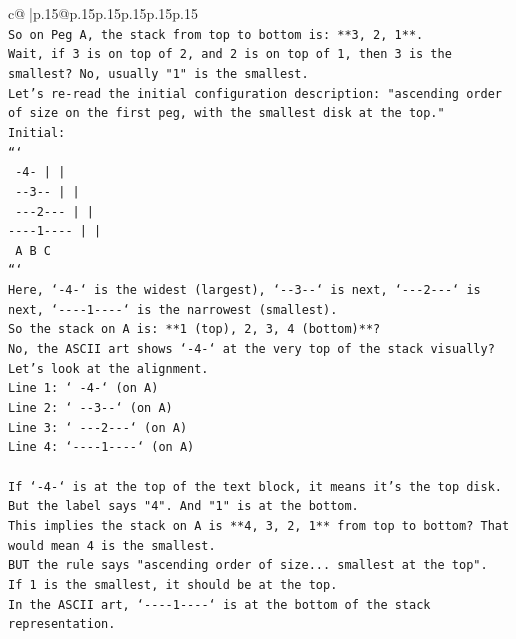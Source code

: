 \documentclass{article}
\begin{document}
{\begin{supertabular}{c@{$\;$}|p{.15\linewidth}@{}p{.15\linewidth}p{.15\linewidth}p{.15\linewidth}p{.15\linewidth}p{.15\linewidth}}
{{{\\ 
\texttt{So on Peg A, the stack from top to bottom is: **3, 2, 1**.} \\
\texttt{Wait, if 3 is on top of 2, and 2 is on top of 1, then 3 is the smallest? No, usually "1" is the smallest.} \\
\texttt{Let's re{-}read the initial configuration description: "ascending order of size on the first peg, with the smallest disk at the top."} \\
\texttt{Initial:} \\
\texttt{```} \\
\texttt{   {-}4{-}        |         |    } \\
\texttt{  {-}{-}3{-}{-}       |         |    } \\
\texttt{ {-}{-}{-}2{-}{-}{-}      |         |    } \\
\texttt{{-}{-}{-}{-}1{-}{-}{-}{-}     |         |    } \\
\texttt{    A         B         C    } \\
\texttt{```} \\
\texttt{Here, `{-}4{-}` is the widest (largest), `{-}{-}3{-}{-}` is next, `{-}{-}{-}2{-}{-}{-}` is next, `{-}{-}{-}{-}1{-}{-}{-}{-}` is the narrowest (smallest).} \\
\texttt{So the stack on A is: **1 (top), 2, 3, 4 (bottom)**?} \\
\texttt{No, the ASCII art shows `{-}4{-}` at the very top of the stack visually?} \\
\texttt{Let's look at the alignment.} \\
\texttt{Line 1: `   {-}4{-}` (on A)} \\
\texttt{Line 2: `  {-}{-}3{-}{-}` (on A)} \\
\texttt{Line 3: ` {-}{-}{-}2{-}{-}{-}` (on A)} \\
\texttt{Line 4: `{-}{-}{-}{-}1{-}{-}{-}{-}` (on A)} \\
\\ 
\texttt{If `{-}4{-}` is at the top of the text block, it means it's the top disk. But the label says "4". And "1" is at the bottom.} \\
\texttt{This implies the stack on A is **4, 3, 2, 1** from top to bottom? That would mean 4 is the smallest.} \\
\texttt{BUT the rule says "ascending order of size... smallest at the top".} \\
\texttt{If 1 is the smallest, it should be at the top.} \\
\texttt{In the ASCII art, `{-}{-}{-}{-}1{-}{-}{-}{-}` is at the bottom of the stack representation.} \\
}}}
\end{supertabular}}
\end{document}
